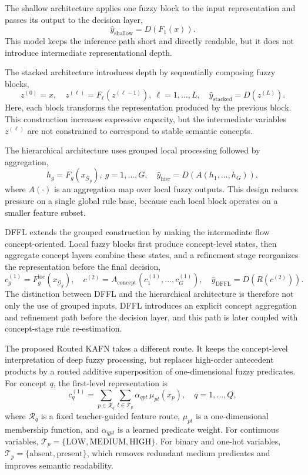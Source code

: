 \documentclass[runningheads]{llncs}
\begin{document}
The shallow architecture applies one fuzzy block to the input representation and passes its output to the decision layer,
\[
\hat{y}_{\mathrm{shallow}} = D\!\left(F_1(x)\right).
\]
This model keeps the inference path short and directly readable, but it does not introduce intermediate representational depth.

The stacked architecture introduces depth by sequentially composing fuzzy blocks,
\[
z^{(0)}=x,\quad
z^{(\ell)} = F_{\ell}\!\left(z^{(\ell-1)}\right),\ \ell=1,\dots,L,\quad
\hat{y}_{\mathrm{stacked}} = D\!\left(z^{(L)}\right).
\]
Here, each block transforms the representation produced by the previous block. This construction increases expressive capacity, but the intermediate variables $z^{(\ell)}$ are not constrained to correspond to stable semantic concepts.

The hierarchical architecture uses grouped local processing followed by aggregation,
\[
h_g = F_g\!\left(x_{\mathcal{G}_g}\right),\ g=1,\dots,G,\quad
\hat{y}_{\mathrm{hier}} = D\!\left(A\!\left(h_1,\dots,h_G\right)\right),
\]
where $A(\cdot)$ is an aggregation map over local fuzzy outputs. This design reduces pressure on a single global rule base, because each local block operates on a smaller feature subset.

DFFL extends the grouped construction by making the intermediate flow concept-oriented. Local fuzzy blocks first produce concept-level states, then aggregate concept layers combine these states, and a refinement stage reorganizes the representation before the final decision,
\[
c_g^{(1)} = F_g^{\mathrm{loc}}\!\left(x_{\mathcal{G}_g}\right),\quad
c^{(2)} = A_{\mathrm{concept}}\!\left(c_1^{(1)},\dots,c_G^{(1)}\right),\quad
\hat{y}_{\mathrm{DFFL}} = D\!\left(R\!\left(c^{(2)}\right)\right).
\]
The distinction between DFFL and the hierarchical architecture is therefore not only the use of grouped inputs. DFFL introduces an explicit concept aggregation and refinement path before the decision layer, and this path is later coupled with concept-stage rule re-estimation.

The proposed Routed KAFN takes a different route. It keeps the concept-level interpretation of deep fuzzy processing, but replaces high-order antecedent products by a routed additive superposition of one-dimensional fuzzy predicates. For concept $q$, the first-level representation is
\[
c_q^{(1)} =
\sum_{p\in \mathcal{R}_q}
\sum_{t\in \mathcal{T}_p}
\alpha_{qpt}\,\mu_{pt}(x_p),
\quad q=1,\dots,Q,
\]
where $\mathcal{R}_q$ is a fixed teacher-guided feature route, $\mu_{pt}$ is a one-dimensional membership function, and $\alpha_{qpt}$ is a learned predicate weight. For continuous variables, $\mathcal{T}_p=\{\mathrm{LOW},\mathrm{MEDIUM},\mathrm{HIGH}\}$. For binary and one-hot variables, $\mathcal{T}_p=\{\mathrm{absent},\mathrm{present}\}$, which removes redundant medium predicates and improves semantic readability.
\end{document}
